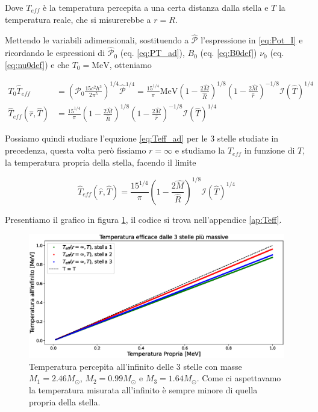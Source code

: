 \documentclass[a4paper, titlepage]{article}
\begin{document}
Dove $T_{eff}$ è la temperatura percepita a una certa distanza dalla stella e
$T$ la temperatura reale, che si misurerebbe a $r = R$.

Mettendo le variabili adimensionali, sostituendo a $\mathcal{\hat P}$
l'espressione in \ref{eq:Pot_I} e ricordando le espressioni di
$\mathcal{\hat P}_0$ (eq. \ref{eq:PT_ad}), $B_0$ (eq. \ref{eq:B0def}) $\nu_0$
(eq. \ref{eq:nu0def}) e che $T_0 = \unit{\mega\electronvolt}$, otteniamo

\begin{align}
    T_0 \hat T_{eff}
    &= \left( \mathcal P_0 \frac{15 c^2 h^3}{2 \pi^5} \right)^{1/4}
    \mathcal{\hat P}^{1/4}
    = \frac{15^{1/4}}{\pi} \unit{\mega\electronvolt}
    \left(1 - \frac{2 \hat M}{\hat R}\right)^{1/8}
    \left(1 - \frac{2 \hat M}{\hat r}\right)^{-1/8} \mathcal I (\hat T)^{1/4} \\
    \hat T_{eff}(\hat r, \hat T)
    &= \frac{15^{1/4}}{\pi} \left(1 - \frac{2 \hat M}{\hat R} \right)^{1/8}
    \left(1 - \frac{2 \hat M}{\hat r} \right)^{-1/8} \mathcal{I} (\hat T)^{1/4}
    \label{eq:Teff_ad}
\end{align}

Possiamo quindi studiare l'equzione \ref{eq:Teff_ad} per le 3 stelle studiate in
precedenza, questa volta però fissiamo $r = \infty$ e studiamo la $T_{eff}$ in
funzione di $T$, la temperatura propria della stella, facendo il limite

\begin{equation}
    \hat T_{eff}(\hat r, \hat T) = \frac{15^{1/4}}{\pi}
    \left(1 - \frac{2 \hat M}{\hat R} \right)^{1/8} \mathcal{I} (\hat T)^{1/4}
\end{equation}

Presentiamo il grafico in figura \ref{fig:Teff}, il codice si trova
nell'appendice \ref{ap:Teff}.

\begin{figure}[h]
    \centering
    \includegraphics[width = \textwidth]{Figures/Teff.eps}
    \caption{Temperatura percepita all'infinito delle 3 stelle con masse
    $M_1 = 2.46 M_\odot$, $M_2 = 0.99 M_\odot$ e $M_3 = 1.64 M_\odot$.
    Come ci aspettavamo la temperatura misurata all'infinito è sempre minore di
    quella propria della stella.}
    \label{fig:Teff}
\end{figure}
\end{document}
